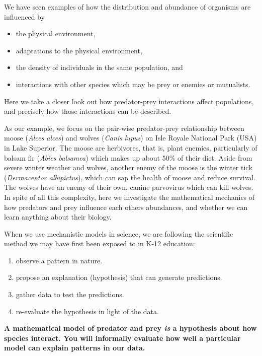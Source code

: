 \documentclass[
  letterpaper,
  DIV=11,
  numbers=noendperiod]{scrreprt}
\providecommand{\tightlist}{%
  \setlength{\itemsep}{0pt}\setlength{\parskip}{0pt}}
\begin{document}
We have seen examples of how the distribution and abundance of organisms
are influenced by

\begin{itemize}
\tightlist
\item
  the physical environment,
\item
  adaptations to the physical environment,
\item
  the density of individuals in the same population, and
\item
  interactions with other species which may be prey or enemies or
  mutualists.
\end{itemize}

Here we take a closer look out how predator-prey interactions affect
populations, and precisely how those interactions can be described.

As our example, we focus on the pair-wise predator-prey relationship
between moose (\emph{Alces alces}) and wolves (\emph{Canis lupus}) on
Isle Royale National Park (USA) in Lake Superior. The moose are
herbivores, that is, plant enemies, particularly of balsam fir
(\emph{Abies balsamea}) which makes up about 50\% of their diet. Aside
from severe winter weather and wolves, another enemy of the moose is the
winter tick (\emph{Dermacentor albipictus}), which can sap the health of
moose and reduce survival. The wolves have an enemy of their own, canine
parvovirus which can kill wolves. In spite of all this complexity, here
we investigate the mathematical mechanics of how predators and prey
influence each others abundances, and whether we can learn anything
about their biology.

When we use mechanistic models in science, we are following the
scientific method we may have first been exposed to in K-12 education:

\begin{enumerate}
\def\labelenumi{\arabic{enumi}.}
\tightlist
\item
  observe a pattern in nature.
\item
  propose an explanation (hypothesis) that can generate predictions.
\item
  gather data to test the predictions.
\item
  re-evaluate the hypothesis in light of the data.
\end{enumerate}

\textbf{A mathematical model of predator and prey \emph{is} a hypothesis
about how species interact. You will informally evaluate how well a
particular model can explain patterns in our data.}
\end{document}
